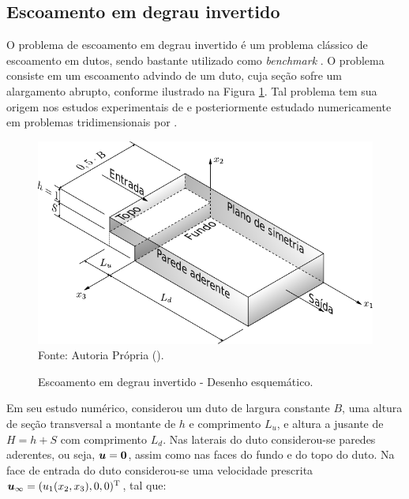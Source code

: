 \subsection{Escoamento em degrau invertido} \label{ex:backwardFacingStep}

O problema de escoamento em degrau invertido é um problema clássico de escoamento em dutos, sendo bastante utilizado como \textit{benchmark} \cite{armaly1983experimental,chiang1999numerical}. O problema consiste em um escoamento advindo de um duto, cuja seção sofre um alargamento abrupto, conforme ilustrado na Figura \ref{fig:step}. Tal problema tem sua origem nos estudos experimentais de  e posteriormente estudado numericamente em problemas tridimensionais por .

\begin{figure}[h!]
    \centering
    \caption{Escoamento em degrau invertido - Desenho esquemático.}
    \includegraphics[width=.7\linewidth]{Figuras/backwardFacingStep/backwardFacingStep.pdf}
    \\Fonte: Autoria Própria (\the\year).
    \label{fig:step}
\end{figure}

Em seu estudo numérico,  considerou um duto de largura constante $B$, uma altura de seção transversal a montante de $h$ e comprimento $L_u$, e altura a jusante de $H=h+S$ com comprimento $L_d$. Nas laterais do duto considerou-se paredes aderentes, ou seja, $\boldsymbol{u}=\boldsymbol{0}$, assim como nas faces do fundo e do topo do duto. Na face de entrada do duto considerou-se uma velocidade prescrita $\boldsymbol{u}_\infty=(u_1(x_2,x_3),0,0)^\mathrm{T}$, tal que:

